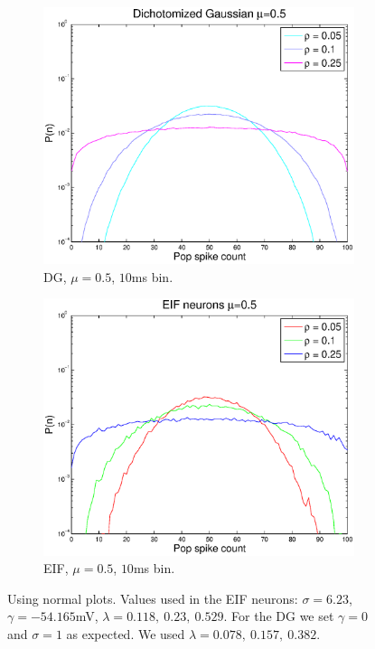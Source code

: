 \documentclass[11pt]{article}
\begin{document}
\begin{figure}[H]
	\begin{subfigure}[h]{0.5\textwidth}
	\centering
	\includegraphics[width=\textwidth]{../Figures/DG/DG_Macke_2a_mu_05_semilog}
	\caption{DG, $\mu = 0.5$, $10$ms bin.}
	\label{fig11}
	\end{subfigure}
	\begin{subfigure}[h]{0.5\textwidth}
	\centering
	\includegraphics[width=\textwidth]{../Figures/EIF/EIF_Macke_2a_mu_05_semilog}
	\caption{EIF, $\mu = 0.5$, $10$ms bin.}
	\label{fig12}
	\end{subfigure}
	\caption{\footnotesize Using normal plots. Values used in the EIF neurons: $\sigma = 6.23$, $\gamma = -54.165$mV, $\lambda = 0.118,~0.23,~0.529$. For the DG we set $\gamma = 0$ and $\sigma = 1$ as expected. We used $\lambda = 0.078,~0.157,~0.382$.}
\end{figure}
\end{document}
